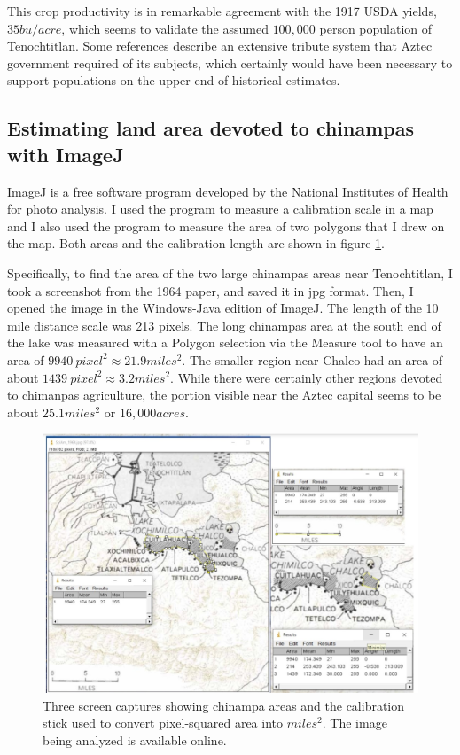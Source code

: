 \documentclass[jou]{apa7}
\begin{document}
This crop productivity is in remarkable agreement with the 1917 USDA yields, $35bu/acre$, which seems to validate the assumed $100,000$ person population of Tenochtitlan.  Some references\cite{Chinampas_1964} describe an extensive tribute system that Aztec government required of its subjects, which certainly would have been necessary to support populations on the upper end of historical estimates.\cite{400k}

\subsection{Estimating land area devoted to chinampas with ImageJ}
\label{appx_imageJ}

ImageJ is a free software program developed by the National Institutes of Health for photo analysis.\cite{imageJ}  I used the program to measure a calibration scale in a map and I also used the program to measure the area of two polygons that I drew on the map.  Both areas and the calibration length are shown in figure \ref{imageJ}.

Specifically, to find the area of the two large chinampas areas near Tenochtitlan, I took a screenshot from the 1964 paper,\cite{Chinampas_1964} and saved it in jpg format.  Then, I opened the image in the Windows-Java edition of ImageJ.\cite{imageJ}  The length of the 10 mile distance scale was 213 pixels. The long chinampas area at the south end of the lake was measured with a Polygon selection via the Measure tool to have an area of $9940~pixel^2\approx21.9miles^2$.  The smaller region near Chalco had an area of about $1439~pixel^2\approx3.2miles^2$.  While there were certainly other regions devoted to chimanpas agriculture, the portion visible near the Aztec capital seems to be about $25.1miles^2$ or $16,000acres$.  

\begin{figure}[ht!]
\centering
\includegraphics[width=\columnwidth]{imageJ_analysis.jpg}
\caption{
Three screen captures showing chinampa areas and the calibration stick used to convert pixel-squared area into $miles^2$.  The image being analyzed is available online. \cite{Chinampas_1964}
}
\label{imageJ}
\end{figure}
\end{document}

